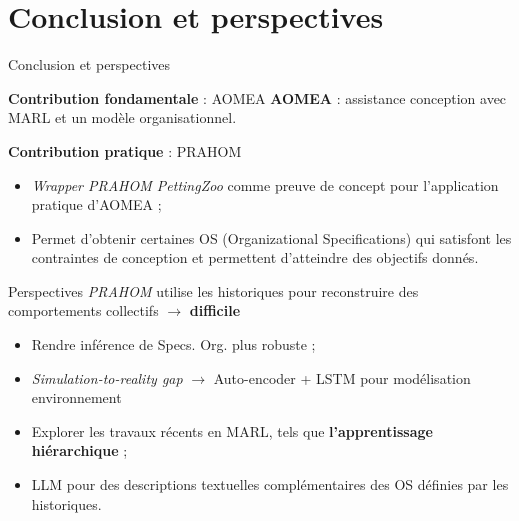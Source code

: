 \section{Conclusion et perspectives}
\begin{frame}{Conclusion et perspectives}
    {}

    \begin{prosblock}{\textbf{Contribution fondamentale} : AOMEA}
        \textbf{AOMEA} : assistance conception avec MARL et un modèle organisationnel.
    \end{prosblock}

    \begin{prosblock}{\textbf{Contribution pratique} : PRAHOM}

        \begin{itemize}
            \item \emph{Wrapper PRAHOM PettingZoo} comme preuve de concept pour l'application pratique d'AOMEA ;
            \item Permet d'obtenir certaines OS (Organizational Specifications) qui satisfont les contraintes de conception et permettent d'atteindre des objectifs donnés.
        \end{itemize}

    \end{prosblock}

    \begin{alertblock}{Perspectives}
        \emph{PRAHOM} utilise les historiques pour reconstruire des comportements collectifs $\rightarrow$ \textbf{difficile}
        \begin{itemize}
            \item Rendre inférence de Specs. Org. plus robuste ;
            \item \textit{Simulation-to-reality gap} $\rightarrow$ Auto-encoder + LSTM pour modélisation environnement
            \item Explorer les travaux récents en MARL, tels que \textbf{l'apprentissage hiérarchique} ;
            \item LLM pour des descriptions textuelles complémentaires des OS définies par les historiques.
        \end{itemize}
    \end{alertblock}

\end{frame}
